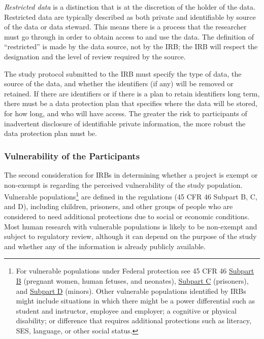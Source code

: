 \emph{Restricted data} is a distinction that is at the discretion of the holder of the data. Restricted data are typically described as both private and identifiable by source of the data or data steward. This means there is a process that the researcher must go through in order to obtain access to and use the data. The definition of ``restricted'' is made by the data source, not by the IRB; the IRB will respect the designation and the level of review required by the source.

The study protocol submitted to the IRB must specify the type of data, the source of the data, and whether the identifiers (if any) will be removed or retained. If there are identifiers or if there is a plan to retain identifiers long term, there must be a data protection plan that specifies where the data will be stored, for how long, and who will have access. The greater the risk to participants of inadvertent disclosure of identifiable private information, the more robust the data protection plan must be.

\hypertarget{vulnerability-of-the-participants}{%
\subsubsection{Vulnerability of the Participants}\label{vulnerability-of-the-participants}}

The second consideration for IRBs in determining whether a project is exempt or non-exempt is regarding the perceived vulnerability of the study population. Vulnerable populations\footnote{For vulnerable populations under Federal protection see 45 CFR 46 \href{https://www.law.cornell.edu/cfr/text/45/part-46/subpart-B}{Subpart B} (pregnant women, human fetuses, and neonates), \href{https://www.law.cornell.edu/cfr/text/45/part-46/subpart-C}{Subpart C} (prisoners), and \href{https://www.law.cornell.edu/cfr/text/45/part-46/subpart-D}{Subpart D} (minors). Other vulnerable populations identified by IRBs might include situations in which there might be a power differential such as student and instructor, employee and employer; a cognitive or physical disability; or difference that requires additional protections such as literacy, SES, language, or other social status.} are defined in the regulations (45 CFR 46 Subpart B, C, and D), including children, prisoners, and other groups of people who are considered to need additional protections due to social or economic conditions. Most human research with vulnerable populations is likely to be non-exempt and subject to regulatory review, although it can depend on the purpose of the study and whether any of the information is already publicly available.


